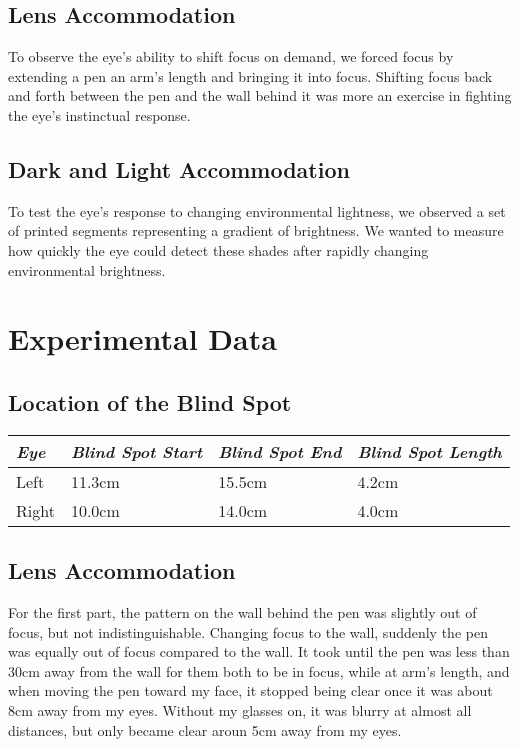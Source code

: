 \documentclass{article}
\begin{document}
\subsection{Lens Accommodation}
To observe the eye's ability to shift focus on demand, we forced focus by extending a pen an arm's length and bringing it into focus. Shifting focus back and forth between the pen and the wall behind it was more an exercise in fighting the eye's instinctual response.

\subsection{Dark and Light Accommodation}
To test the eye's response to changing environmental lightness, we observed a set of printed segments representing a gradient of brightness. We wanted to measure how quickly the eye could detect these shades after rapidly changing environmental brightness.

\section{Experimental Data}
\subsection{Location of the Blind Spot}

\begin{table}[ht]
\centering
\begin{tabular}{|l|l|l|l|}
\hline
\emph{Eye}   & \emph{Blind Spot Start} & \emph{Blind Spot End} & \emph{Blind Spot Length} \\ \hline
Left  & 11.3cm           & 15.5cm         & 4.2cm             \\ \hline
Right & 10.0cm           & 14.0cm         & 4.0cm             \\ \hline
\end{tabular}
\end{table}

\subsection{Lens Accommodation}
For the first part, the pattern on the wall behind the pen was slightly out of focus, but not indistinguishable. Changing focus to the wall, suddenly the pen was equally out of focus compared to the wall. It took until the pen was less than 30cm away from the wall for them both to be in focus, while at arm's length, and when moving the pen toward my face, it stopped being clear once it was about 8cm away from my eyes. Without my glasses on, it was blurry at almost all distances, but only became clear aroun 5cm away from my eyes.
\end{document}
